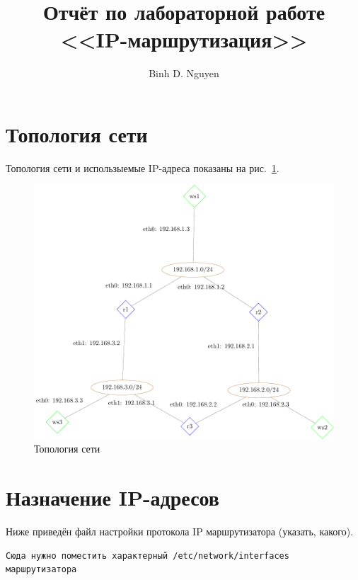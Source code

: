 \documentclass[a4paper,12pt]{article}
\title{Отчёт по лабораторной работе \\ <<IP-маршрутизация>>}
\author{Binh D. Nguyen}
\begin{document}
\maketitle

\tableofcontents


\section{Топология сети}

Топология сети и использыемые IP-адреса показаны на рис.~\ref{fig:network}.

\begin{figure}
\centering
\includegraphics[width=\textwidth]{includes/network_gv.pdf}
\caption{Топология сети}
\label{fig:network}
\end{figure}


\section{Назначение IP-адресов}

Ниже приведён файл настройки протокола IP маршрутизатора (указать, какого).

\begin{Verbatim}
Сюда нужно поместить характерный /etc/network/interfaces маршрутизатора
\end{Verbatim}
\end{document}
